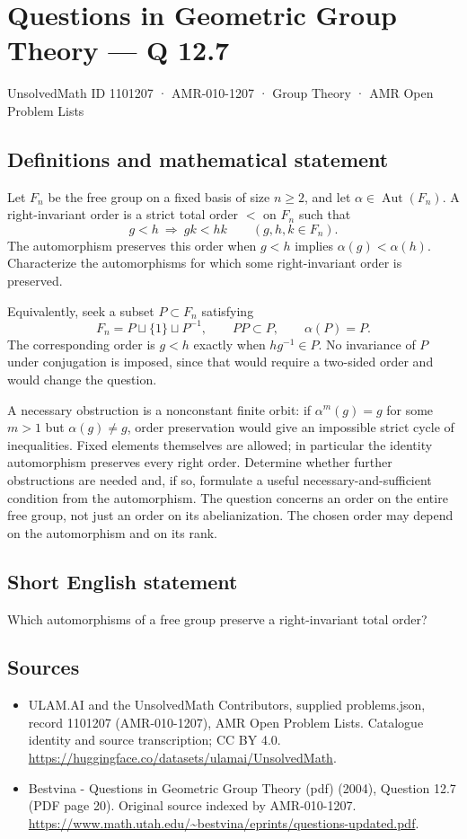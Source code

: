 \documentclass[11pt,a4paper]{article}
\begin{document}
\section*{Questions in Geometric Group Theory — Q 12.7}\label{1101207}
{\small UnsolvedMath ID 1101207 · AMR-010-1207 · Group Theory · AMR Open Problem Lists}
\subsection{Definitions and mathematical statement}
Let $F_n$ be the free group on a fixed basis of size $n\geq2$, and let $\alpha\in\operatorname{Aut}(F_n)$. A right-invariant order is a strict total order $<$ on $F_n$ such that
\[
 g<h\ \Longrightarrow\ gk<hk\qquad(g,h,k\in F_n).
\]
The automorphism preserves this order when $g<h$ implies $\alpha(g)<\alpha(h)$. Characterize the automorphisms for which some right-invariant order is preserved.

Equivalently, seek a subset $P\subset F_n$ satisfying
\[
 F_n=P\sqcup\{1\}\sqcup P^{-1},\qquad PP\subset P,
 \qquad\alpha(P)=P.
\]
The corresponding order is $g<h$ exactly when $hg^{-1}\in P$. No invariance of $P$ under conjugation is imposed, since that would require a two-sided order and would change the question.

A necessary obstruction is a nonconstant finite orbit: if $\alpha^m(g)=g$ for some $m>1$ but $\alpha(g)\ne g$, order preservation would give an impossible strict cycle of inequalities. Fixed elements themselves are allowed; in particular the identity automorphism preserves every right order. Determine whether further obstructions are needed and, if so, formulate a useful necessary-and-sufficient condition from the automorphism. The question concerns an order on the entire free group, not just an order on its abelianization. The chosen order may depend on the automorphism and on its rank.
\subsection{Short English statement}
Which automorphisms of a free group preserve a right-invariant total order?
\subsection{Sources}
\begin{itemize}
\item[S1] ULAM.AI and the UnsolvedMath Contributors, supplied problems.json, record 1101207 (AMR-010-1207), AMR Open Problem Lists. Catalogue identity and source transcription; CC BY 4.0.
\url{https://huggingface.co/datasets/ulamai/UnsolvedMath}.
\item[S2] Bestvina - Questions in Geometric Group Theory (pdf) (2004), Question 12.7 (PDF page 20). Original source indexed by AMR-010-1207.
\url{https://www.math.utah.edu/~bestvina/eprints/questions-updated.pdf}.
\end{itemize}
\end{document}
